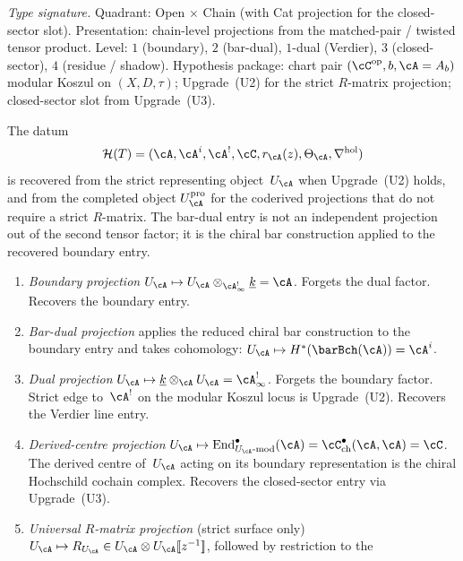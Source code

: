 \begin{corollary}
\label{cor:hdm-u-a-six-projections}
\emph{Type signature.} Quadrant: Open $\times$ Chain (with Cat
projection for the closed-sector slot). Presentation: chain-level
projections from the matched-pair / twisted tensor product. Level:
$1$ (boundary), $2$ (bar-dual), $1$-dual (Verdier), $3$
(closed-sector), $4$ (residue / shadow). Hypothesis package: chart
pair $(\cC^{\mathrm{op}}, b, \cA = A_b)$ modular Koszul on
$(X, D, \tau)$; Upgrade~\textup{(U2)} for the strict $R$-matrix
projection; closed-sector slot from Upgrade~\textup{(U3)}.

The datum
\[
\mathcal H(T)
=
(\cA,\cA^i,\cA^!,\cC,r_\cA(z),\Theta_\cA,\nabla^{\mathrm{hol}})
\]
is recovered from the strict representing object~$U_\cA$ when
Upgrade~\textup{(U2)} holds, and from the completed object
$U_\cA^{\mathrm{pro}}$ for the coderived projections that do not require
a strict $R$-matrix. The bar-dual entry is not an independent projection
out of the second tensor factor; it is the chiral bar construction
applied to the recovered boundary entry.
\begin{enumerate}[label=\textup{(P\arabic*)}]
\item \emph{Boundary projection} $U_\cA \mapsto U_\cA \otimes_{\cA^{!}_\infty}
 \underline{k} = \cA$. Forgets the dual factor. Recovers the boundary entry.
\item \emph{Bar-dual projection} applies the reduced chiral bar
 construction to the boundary entry and takes cohomology:
 $U_\cA\mapsto H^*(\barBch(\cA))=\cA^i$.
\item \emph{Dual projection} $U_\cA \mapsto \underline{k} \otimes_\cA
 U_\cA = \cA^{!}_\infty$. Forgets the boundary factor. Strict
 edge to~$\cA^!$ on the modular Koszul locus is Upgrade~\textup{(U2)}.
 Recovers the Verdier line entry.
\item \emph{Derived-centre projection} $U_\cA \mapsto
 \mathrm{End}^{\bullet}_{U_\cA\text{-}\mathrm{mod}}(\cA) =
 \cC^{\bullet}_{\mathrm{ch}}(\cA, \cA) = \cC$. The derived
 centre of~$U_\cA$ acting on its boundary representation is the chiral
 Hochschild cochain complex. Recovers the closed-sector entry via
 Upgrade~\textup{(U3)}.
\item \emph{Universal $R$-matrix projection} \textup{(strict surface only)}
 $U_\cA \mapsto R_{U_\cA} \in
 U_\cA \otimes U_\cA[\![z^{-1}]\!]$, followed by restriction to the

\end{enumerate}
\end{corollary}
